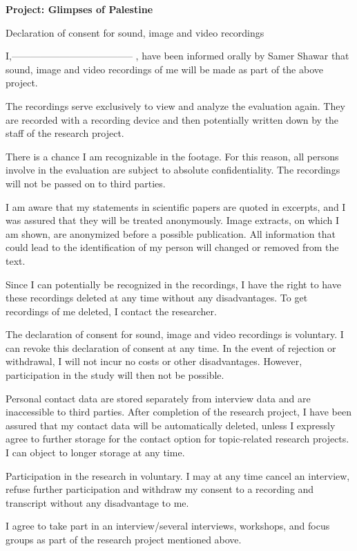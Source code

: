 


\textbf{Project: Glimpses of Palestine}


Declaration of consent for sound, image and video recordings



I,-------------------------------------- , have been informed orally by Samer Shawar that sound, image and video recordings of me will be made as part of the above project.

The recordings serve exclusively to view and analyze the evaluation again. They are recorded with a recording device and then potentially written down by the staff of the research project.

There is a chance I am recognizable in the footage. For this reason, all persons involve in the evaluation are subject to absolute confidentiality. The recordings will not be passed on to third parties.

I am aware that my statements in scientific papers are quoted in excerpts, and I was assured that they will be treated anonymously. Image extracts, on which I am shown, are anonymized before a possible publication. All information that could lead to the identification of my person will changed or removed from the text.

Since I can potentially be recognized in the recordings, I have the right to have these recordings deleted at any time without any disadvantages. To get recordings of me deleted, I contact the researcher.

The declaration of consent for sound, image and video recordings is voluntary. I can revoke this declaration of consent at any time. In the event of rejection or withdrawal, I will not incur no costs or other disadvantages. However, participation in the study will then not be possible.

Personal contact data are stored separately from interview data and are inaccessible to third parties. After completion of the research project, I have been assured that my contact data will be automatically deleted, unless I expressly agree to further storage for the contact option for topic-related research projects. I can object to longer storage at any time.

Participation in the research in voluntary. I may at any time cancel an interview, refuse further participation and withdraw my consent to a recording and transcript without any disadvantage to me.

\vspace{5mm}
I agree to take part in an interview/several interviews, workshops, and focus groups as part of the research project mentioned above.


